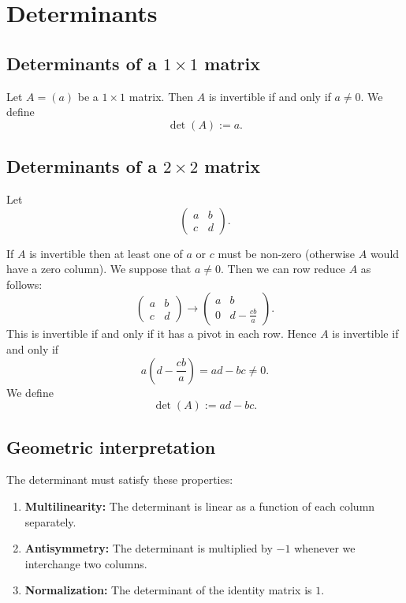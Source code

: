 \documentclass[12pt, a4paper]{article}
\theoremstyle{definition}
\theoremstyle{plain}
\begin{document}
\section{Determinants}

\subsection*{Determinants of a $1\times1$ matrix}

Let $A =(a)$ be a $1\times1$ matrix. Then $A$ is invertible if and only if $a\neq0$. We define $$\det{(A)}:=a.$$

\subsection*{Determinants of a $2\times2$ matrix}

Let $$\begin{pmatrix} a & b \\ c & d \end{pmatrix}.$$

If $A$ is invertible then at least one of $a$ or $c$ must be non-zero (otherwise $A$ would have a zero column). We suppose that $a\neq0$. Then we can row reduce $A$ as follows: $$\begin{pmatrix} a & b \\ c & d \end{pmatrix} \longrightarrow \begin{pmatrix} a & b \\ 0 & d-\frac{cb}{a} \end{pmatrix}.$$ This is invertible if and only if it has a pivot in each row. Hence $A$ is invertible if and only if $$a\left(d-\frac{cb}{a}\right)=ad-bc\neq0.$$ We define $$\det{(A)}:=ad-bc.$$

\subsection{Geometric interpretation}

The determinant must satisfy these properties:

\begin{tcolorbox}
\begin{enumerate}
	
	\item \textbf{Multilinearity:} The determinant is linear as a function of each column separately.
	\item \textbf{Antisymmetry:} The determinant is multiplied by $-1$ whenever we interchange two columns.
	\item \textbf{Normalization:} The determinant of the identity matrix is $1$.

\end{enumerate}
\end{tcolorbox}
\end{document}
